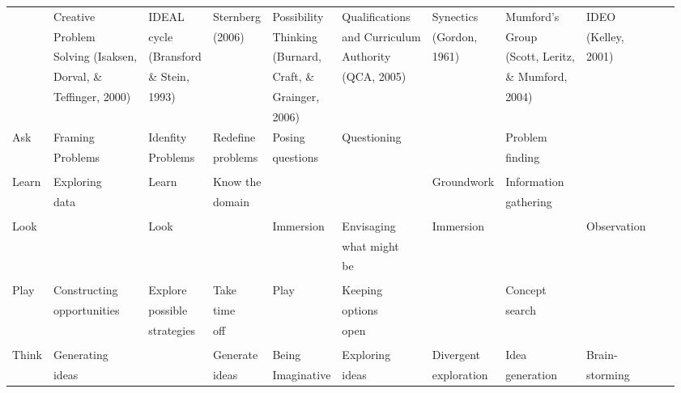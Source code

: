 \documentclass[11pt, oneside]{article}   	%
\begin{document}
\begin{landscape}
\begin{table}[ht]
\centering
\begin{tabular}{lllllllllll}
  \hline
					& Creative   				& IDEAL 		& Sternberg 	& Possibility 		& Qualifications 	&  Synectics		& Mumford's 	& IDEO 	 \\ 
					& Problem  				& cycle 		& (2006)		& Thinking 		& and Curriculum	& (Gordon, 		& Group		& (Kelley,	 \\
 					& Solving (Isaksen,   		& (Bransford 	& 			& (Burnard,  		& Authority		& 1961)			& (Scott, Leritz,	& 2001)	  \\
 					&Dorval, \& 				& \& Stein,	&			& Craft, \&   		&(QCA, 2005)  		&				& \& Mumford, \\
 					& Teffinger, 2000) 			& 1993) 		& 			& Grainger, 		& 				& 				& 2004)	\\
 					& 						& 			& 			& 2006)\\
  \hline
Ask   				& Framing 				&  Idenfity 	& Redefine 	& Posing			& Questioning 		&  				& Problem 		&   \\ 
 					& Problems 				& Problems  	& problems 	& questions		& 				& 				& finding			\\
	\\
  Learn 	 			& Exploring				& Learn		& Know the 	&  				&  				& Groundwork 		& Information &   \\ 
  	 				& data					& 			& domain 		& 				& 				& 				& gathering \\
	\\
  Look   				& 						& Look 		&  			& Immersion 		& Envisaging 		& Immersion 		&  			& Observation  \\ 
					& 						& 			& 			& 				& what might  \\
					&						& 			& 			& 				& be\\
	\\
  Play  				& Constructing 				& Explore 		& Take 		& Play 			& Keeping 		&  				& Concept &   \\ 
          				& opportunities 				& possible 	& time 		&				& options			& 				& search	\\
          				&						& strategies  	& off 			&				& open \\
				\\
  Think 				& Generating 				&  			& Generate 	& Being 			& Exploring 		& Divergent 		& Idea 		& Brain-   \\ 
  	   				& ideas 					& 			& ideas 		& Imaginative 		& ideas			& exploration		& generation	& storming\\

\end{tabular}
\end{table}
\end{landscape}
\end{document}
